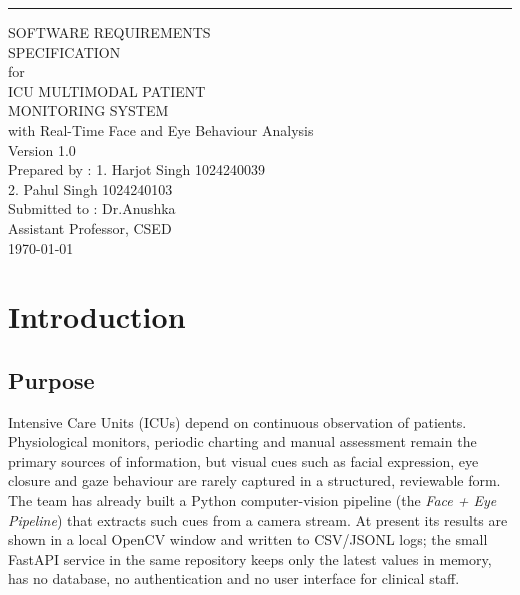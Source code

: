\documentclass[a4paper,11pt]{scrreprt}
\date{}
\def\myversion{1.0 }
\begin{document}
\begin{flushright}
    \rule{16cm}{5pt}\vskip1cm
    \begin{bfseries}
        \Huge{SOFTWARE REQUIREMENTS\\ SPECIFICATION}\\
        \vspace{1.5cm}
        for\\
        \vspace{1.5cm}
        \huge{ICU MULTIMODAL PATIENT\\ MONITORING SYSTEM}\\
        \vspace{0.4cm}
        \Large{with Real-Time Face and Eye Behaviour Analysis}\\
        \vspace{1.5cm}
        \LARGE{Version \myversion}\\
        \vspace{1.5cm}
        \large
        Prepared by : 1. Harjot Singh 1024240039\\
        2. Pahul Singh 1024240103\\
        \vspace{1.5cm}
        Submitted to : Dr.Anushka \\ 
        Assistant Professor, CSED\\
        \vspace{1.5cm}
        \today\\
    \end{bfseries}
\end{flushright}

\tableofcontents
\listoffigures
\listoftables

\chapter{Introduction}

\section{Purpose}
Intensive Care Units (ICUs) depend on continuous observation of patients. Physiological monitors, periodic charting and manual assessment remain the primary sources of information, but visual cues such as facial expression, eye closure and gaze behaviour are rarely captured in a structured, reviewable form. The team has already built a Python computer-vision pipeline (the \emph{Face + Eye Pipeline}) that extracts such cues from a camera stream. At present its results are shown in a local OpenCV window and written to CSV/JSONL logs; the small FastAPI service in the same repository keeps only the latest values in memory, has no database, no authentication and no user interface for clinical staff.
\end{document}
